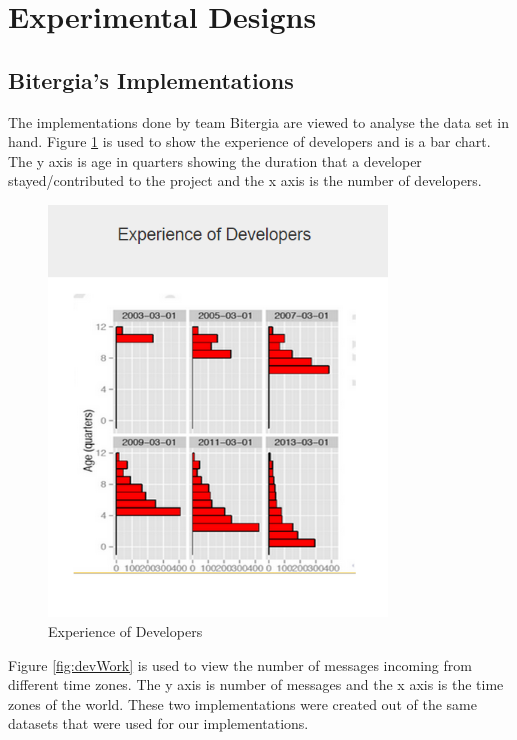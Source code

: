 \documentclass[double,12pt]{beavtex}
\begin{document}
\section{Experimental Designs}

\subsection{Bitergia's Implementations}
The implementations done by team Bitergia are viewed to analyse the data set in hand. Figure \ref{fig:devExp} is used to show the experience of developers and is a bar chart. The y axis is age in quarters showing the duration that a developer stayed/contributed to the project and the x axis is the number of developers.

\begin{figure}[H]
\begin{center}
\includegraphics[width=90mm]{image11.PNG}
\end{center}
\caption{Experience of Developers}
\label{fig:devExp}
\end{figure}

Figure \ref{fig:devWork} is used to view the number of messages incoming from different time zones. The y axis is number of messages and the x axis is the time zones of the world. These two implementations were created out of the same datasets that were used for our implementations.
\end{document}
